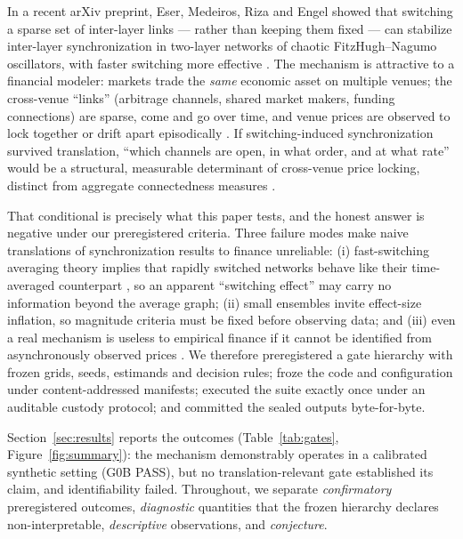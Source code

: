 \documentclass[11pt]{article}
\begin{document}
In a recent arXiv preprint, Eser, Medeiros, Riza and Engel showed that
switching a sparse set of inter-layer links --- rather than keeping them fixed
--- can stabilize inter-layer synchronization in two-layer networks of chaotic
FitzHugh--Nagumo oscillators, with faster switching more effective
\citep{eser2025switching,eser2021edges}. The mechanism is attractive to a
financial modeler: markets trade the \emph{same} economic asset on multiple
venues; the cross-venue ``links'' (arbitrage channels, shared market makers,
funding connections) are sparse, come and go over time, and venue prices are
observed to lock together or drift apart episodically
\citep{hasbrouck1995one,alexander2020bitmex,baur2019price}. If switching-induced
synchronization survived translation, ``which channels are open, in what order,
and at what rate'' would be a structural, measurable determinant of cross-venue
price locking, distinct from aggregate connectedness measures
\citep{diebold2009measuring,diebold2014network,billio2012econometric}.

That conditional is precisely what this paper tests, and the honest answer is
negative under our preregistered criteria. Three failure modes make naive
translations of synchronization results to finance unreliable: (i) fast-switching
averaging theory implies that rapidly switched networks behave like their
time-averaged counterpart
\citep{belykh2004blinking,stilwell2006sufficient,hasler2013dynamics}, so an
apparent ``switching effect'' may carry no information beyond the average
graph; (ii) small ensembles invite effect-size inflation, so magnitude criteria
must be fixed before observing data; and (iii) even a real mechanism is useless
to empirical finance if it cannot be identified from asynchronously observed
prices \citep{epps1979comovements,scholes1977estimating,hayashi2005covariance}.
We therefore preregistered a gate hierarchy with frozen grids, seeds,
estimands and decision rules; froze the code and configuration under
content-addressed manifests; executed the suite exactly once under an
auditable custody protocol; and committed the sealed outputs byte-for-byte.

Section~\ref{sec:results} reports the outcomes
(Table~\ref{tab:gates}, Figure~\ref{fig:summary}): the mechanism demonstrably
operates in a calibrated synthetic setting (G0B PASS), but no
translation-relevant gate established its claim, and identifiability failed.
Throughout, we separate \emph{confirmatory} preregistered outcomes,
\emph{diagnostic} quantities that the frozen hierarchy declares
non-interpretable, \emph{descriptive} observations, and \emph{conjecture}.
\end{document}
